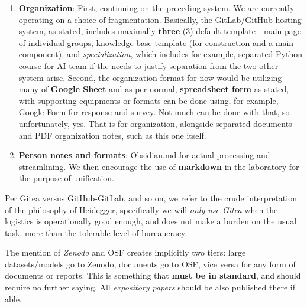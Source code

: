 \documentclass[10pt,a4paper]{article}
\begin{document}
\begin{enumerate}
    \item \textbf{Organization}: First, continuing on the preceding system. We are currently operating on a choice of fragmentation. Basically, the GitLab/GitHub hosting system, as stated, includes maximally \textbf{three} (3) default template - main page of individual groups, knowledge base template (for construction and a main component), and \textit{specialization}, which includes for example, separated Python course for AI team if the needs to justify separation from the two other system arise. Second, the organization format for now would be utilizing many of \textbf{Google Sheet} and as per normal, \textbf{spreadsheet form} as stated, with supporting equipments or formats can be done using, for example, Google Form for response and survey. Not much can be done with that, so unfortunately, yes. That is for organization, alongside separated documents and PDF organization notes, such as this one itself.
    \item \textbf{Person notes and formats}: Obsidian.md for actual processing and streamlining. We then encourage the use of \textbf{markdown} in the laboratory for the purpose of unification. 
\end{enumerate}

Per Gitea versus GitHub-GitLab, and so on, we refer to the crude interpretation of the philosophy of Heidegger, specifically we will \textit{only use Gitea} when the logistics is operationally good enough, and does not make a burden on the usual task, more than the tolerable level of bureaucracy.

The mention of \textit{Zenodo} and OSF creates implicitly two tiers: large datasets/models go to Zenodo, documents go to OSF, vice versa for any form of documents or reports. This is something that \textbf{must be in standard}, and should require no further saying. All \textit{expository papers} should be also published there if able. 


\end{document}
